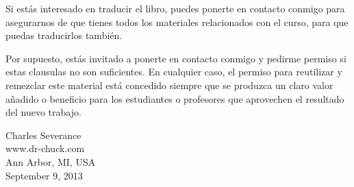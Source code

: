 Si estás interesado en traducir el libro, puedes ponerte en contacto conmigo
para asegurarnos de que tienes todos los materiales relacionados con el curso,
para que puedas traducirlos también.

Por supuesto, estás invitado a ponerte en contacto conmigo y pedirme permiso si estas
clausulas no son suficientes. En cualquier caso, el permiso para reutilizar y
remezclar este material está concedido siempre que se produzca un claro valor añadido
o beneficio para los estudiantes o profesores que aprovechen el resultado
del nuevo trabajo.

Charles Severance\\
www.dr-chuck.com\\
Ann Arbor, MI, USA\\
September 9, 2013



\normalsize

\printindex

\clearemptydoublepage



